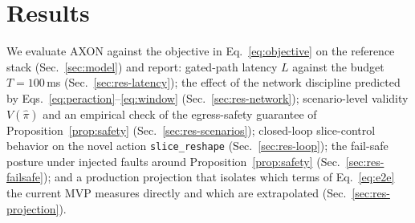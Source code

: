 \section{Results}
\label{sec:results}
We evaluate AXON against the objective in Eq.~\eqref{eq:objective} on the
reference stack (Sec.~\ref{sec:model}) and report: gated-path latency $L$
against the budget $T=100$\,ms (Sec.~\ref{sec:res-latency}); the effect of the
network discipline predicted by Eqs.~\eqref{eq:peraction}--\eqref{eq:window}
(Sec.~\ref{sec:res-network}); scenario-level validity $V(\hat\pi)$ and an
empirical check of the egress-safety guarantee of
Proposition~\ref{prop:safety} (Sec.~\ref{sec:res-scenarios}); closed-loop
slice-control behavior on the novel action \texttt{slice\_reshape}
(Sec.~\ref{sec:res-loop}); the fail-safe posture under injected faults
around Proposition~\ref{prop:safety}
(Sec.~\ref{sec:res-failsafe}); and a production projection that isolates
which terms of Eq.~\eqref{eq:e2e} the current MVP measures directly and
which are extrapolated (Sec.~\ref{sec:res-projection}).

